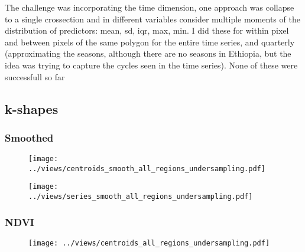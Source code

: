 \documentclass[10pt,a4paper,onecolumn]{article}
\begin{document}
The challenge was incorporating the time dimension, one approach was collapse to a single crossection and in different variables consider multiple moments  of the distribution of predictors: mean, sd, iqr, max, min. I did these for within pixel and between pixels of the same polygon for the entire time series, and quarterly (approximating the seasons, although there are no seasons in Ethiopia, but the idea was trying to capture the cycles seen in the time series).
None of these were successfull so far

\subsection{k-shapes}


\subsubsection{Smoothed}






  \begin{figure}[H] \centering
            \captionsetup{justification=centering}
              \texttt{[image: ../views/centroids\_smooth\_all\_regions\_undersampling.pdf]}
              
 \end{figure}


  \begin{figure}[H] \centering
            \captionsetup{justification=centering}
              \texttt{[image: ../views/series\_smooth\_all\_regions\_undersampling.pdf]}
              
 \end{figure}

 




\subsubsection{NDVI}



  \begin{figure}[H] \centering
            \captionsetup{justification=centering}
              \texttt{[image: ../views/centroids\_all\_regions\_undersampling.pdf]}
              
 \end{figure}
\end{document}
